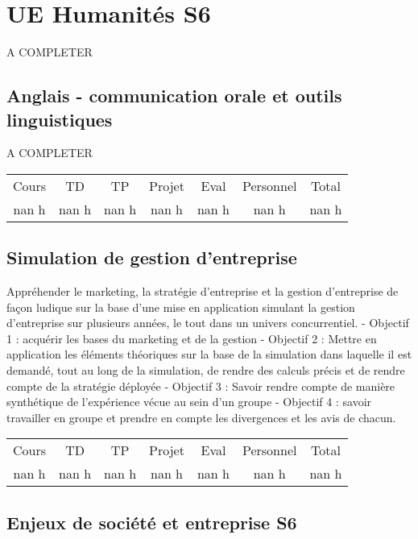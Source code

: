 \section{UE Humanités S6 }%
\label{sec:UEHumanitsS6}%
A COMPLETER%
\subsection{Anglais {-} communication orale et outils linguistiques}%
\label{subsec:Anglais{-}communicationoraleetoutilslinguistiques}%

%
A COMPLETER%
\begin{longtable}{c c c c c c c}%
\hline%
Cours&TD&TP&Projet&Eval&Personnel&Total\\%
nan h&nan h&nan h&nan h&nan h&nan h&nan h\\%
\hline%
\end{longtable}%
\subsection{Simulation de gestion d'entreprise}%
\label{subsec:Simulationdegestiondentreprise}%

%
Appréhender le marketing, la stratégie d'entreprise et la gestion d'entreprise de façon ludique sur la base d'une mise en application simulant la gestion d'entreprise sur plusieurs années, le tout dans un univers concurrentiel. {-} Objectif 1 : acquérir les bases du marketing et de la gestion\newline%
{-} Objectif 2 : Mettre en application les éléments théoriques sur la base de la simulation dans laquelle il est demandé, tout au long de la simulation, de rendre des calculs précis et de rendre compte de la stratégie déployée\newline%
{-} Objectif 3 : Savoir rendre compte de manière synthétique de l’expérience vécue au sein d’un groupe\newline%
{-} Objectif 4 : savoir travailler en groupe et prendre en compte les divergences et les avis de chacun.%
\begin{longtable}{c c c c c c c}%
\hline%
Cours&TD&TP&Projet&Eval&Personnel&Total\\%
nan h&nan h&nan h&nan h&nan h&nan h&nan h\\%
\hline%
\end{longtable}%
\subsection{Enjeux de société et entreprise S6}%
\label{subsec:EnjeuxdesocitetentrepriseS6}%

